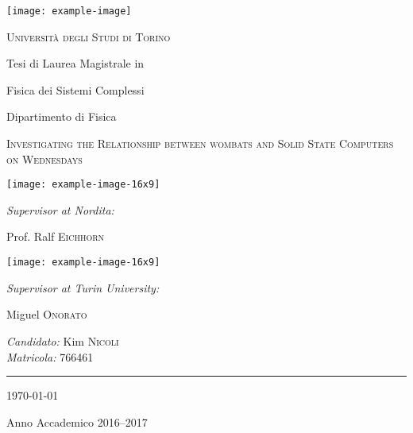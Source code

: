 \documentclass[a4paper,12pt]{book}
\begin{document}
\begin{titlepage}
	\vspace*{-3cm}
	\centering
		\texttt{[image: example-image]}

	{\scshape\LARGE Università degli Studi di Torino\par}

	\vspace{1cm}

	{\large Tesi di Laurea Magistrale in\par
		Fisica dei Sistemi Complessi \par Dipartimento di Fisica\par}

	\vspace{.1\textheight}
	{ \LARGE \scshape Investigating the Relationship between wombats and Solid State Computers on Wednesdays \par}

	\vspace{.1\textheight}

	\parbox{.4\linewidth}{
			\texttt{[image: example-image-16x9]}\par
			{\emph{Supervisor at Nordita:} \par
			Prof. Ralf \textsc{Eichhorn} }
		}\hfill
	\parbox{.5\linewidth}{
		\raggedleft
			\texttt{[image: example-image-16x9]}\par
			\emph{Supervisor at Turin University:}\par
			Miguel \textsc{Onorato}%
	}

		\vspace{.1\linewidth}

			{\emph{Candidato:}
			Kim \textsc{Nicoli} }\\
			{\emph{Matricola:}
			\textsc{766461} }\\

			\vfill

			\rule{.4\textwidth}{.4pt}

	{\large \today\par
	Anno Accademico 2016--2017\par}



\end{titlepage}
\end{document}
